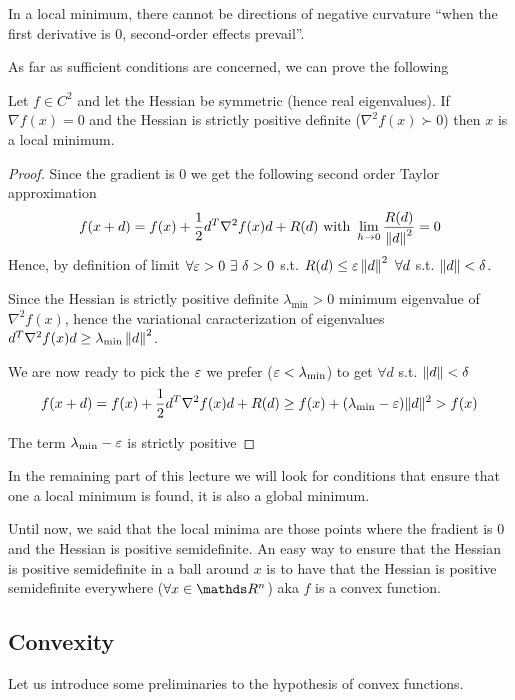 \documentclass[computationalMathematics.tex]{subfiles}
\begin{document}
  In a local minimum, there cannot be directions of  negative curvature ``when the first derivative is $0$, second-order effects prevail''.

As far as sufficient conditions are concerned, we can prove the following

\begin{proposition}
  Let $f \in C^2$ and let the Hessian be symmetric (hence real eigenvalues).
  If $\nabla f(x) = 0$ and the Hessian is strictly positive definite ($\nabla^2 f(x) \succ 0$) then $x$ is a local minimum.
\end{proposition}

\begin{proof}
Since the gradient is $0$ we get the following second order Taylor approximation
\[
  f(x + d) = f(x) + \frac{1}{2} d^T \nabla^2 f(x) d + R(d)\mbox{ with } \lim\limits_{h \to 0} \frac{R(d)}{\left\lVert d\right\rVert^2} = 0
\]
  Hence, by definition of limit $\forall \varepsilon > 0~\exists~\delta > 0$ s.t. $R(d) \leq \varepsilon \left\lVert d\right\rVert^2~\forall d$ s.t. $\left\lVert d\right\rVert < \delta$.

Since the Hessian is strictly positive definite $\lambda_{\text{min}} > 0$ minimum eigenvalue of $\nabla^2 f(x)$, hence the variational caracterization of eigenvalues $d^T \nabla^2 f(x) d \geq \lambda_{\text{min}} \left\lVert d\right\rVert^2$.

  We are now ready to pick the $\varepsilon$ we prefer ($\varepsilon < \lambda_{\text{min}}$) to get $\forall d$ s.t. $\left\lVert d\right\rVert < \delta$
\[
  f(x + d) = f(x) + \frac{1}{2} d^T \nabla^2 f(x) d + R(d) \geq f(x) + (\lambda_{\text{min}} - \varepsilon)\|d\|^2 > f(x)
\]

  The term $\lambda_{\text{min}} - \varepsilon$ is strictly positive
\end{proof}

In the remaining part of this lecture we will look for conditions that ensure that one a local minimum is found, it is also a global minimum.

Until now, we said that the local minima are those points where the fradient is $0$ and the Hessian is positive semidefinite.
An easy way to ensure that the Hessian is positive semidefinite in a ball around $x$ is to have that the Hessian is positive semidefinite everywhere ($\forall x \in \R^n$) aka $f$ is a convex function.

\subsection{Convexity}
Let us introduce some preliminaries to the hypothesis of convex functions.
\end{document}
